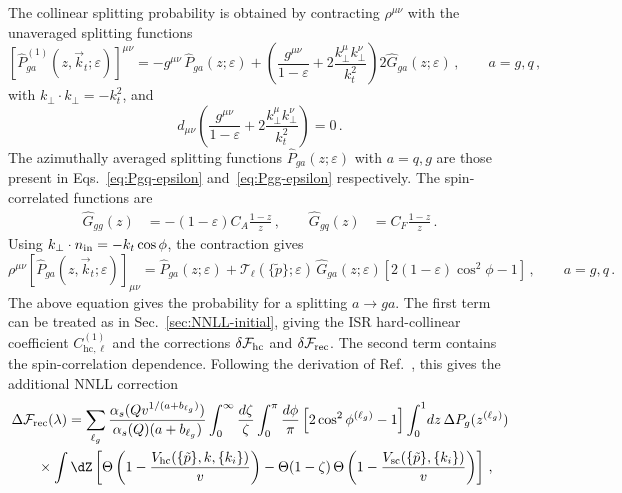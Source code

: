 The collinear splitting probability is obtained by contracting
$\rho^{\mu\nu}$ with the unaveraged splitting functions
\begin{equation}
\left[\hat{P}_{ga}^{(1)}(z,\vec k_t;\varepsilon)\right]^{\mu\nu}
= -g^{\mu\nu}\,\hat{P}_{ga}(z;\varepsilon)
+ \left(\frac{g^{\mu\nu}}{1-\varepsilon} + 2\frac{k_\perp^\mu k_\perp^\nu}{k_t^2}\right)
2\hat G_{ga}(z;\varepsilon)\,, \qquad a = g,q\,,
\end{equation}
with $k_\perp\cdot k_\perp = -k_t^2$, and
\begin{equation}
  \label{eq:Grho}
  d_{\mu\nu}\left(\frac{g^{\mu\nu}}{1-\varepsilon} + 2\frac{k_\perp^\mu k_\perp^\nu}{k_t^2}\right)=0\,.
\end{equation}
The azimuthally averaged splitting functions $\hat{P}_{ga}(z;\varepsilon)$ with $a=q,g$ are those present in Eqs.~\eqref{eq:Pgq-epsilon} and~\eqref{eq:Pgg-epsilon} respectively.
The spin-correlated functions are 
\begin{equation}
\begin{aligned}
\hat G_{gg}(z) &= -(1-\varepsilon)C_A \frac{1-z}{z}\,,\qquad
\hat G_{gq}(z) &= C_F \frac{1-z}{z}\,.
\end{aligned}
\end{equation}
Using $k_\perp \cdot n_{\rm in}=-k_t\cos\phi$, the contraction gives
\begin{equation}
\rho^{\mu\nu}\left[\hat{P}_{ga}(z,\vec k_t;\varepsilon)\right]_{\mu\nu}
= \hat{P}_{ga}(z;\varepsilon)
+  \mathcal{T}_\ell(\{\tilde p\};\varepsilon)\,\hat G_{ga}(z;\varepsilon)\left[2(1-\varepsilon)\cos^2\phi - 1\right]\,,
\qquad a = g,q\,.
\end{equation}
The above equation gives the probability for a splitting $a\to g
a$. The first term can be treated as in Sec.~\ref{sec:NNLL-initial},
giving the ISR hard-collinear coefficient $C_{\mathrm{hc},\ell}^{(1)}$
and the corrections $\delta\mathcal{F}_{\rm hc}$ and
$\delta\mathcal{F}_{\rm rec}$. The second term contains the
spin-correlation dependence. Following the derivation of
Ref.~\cite{Arpino:2019ozn}, this gives the additional NNLL correction
\begin{equation}
\begin{aligned}
\label{eq:DFrec-ISR}
  \Delta&\mathcal{F}_{\mathrm{rec}}(\lambda) =
\sum_{\ell_g}\frac{\alpha_s(Qv^{1/(a+b_{\ell_g})})}{\alpha_s(Q)(a+b_{\ell_g})}\int_0^\infty \frac{d\zeta}{\zeta}
\int_0^\pi \frac{d\phi}{\pi}\left[2\cos^2\phi^{(\ell_g)} - 1\right]
\int_0^1\!dz\,
\Delta P_g(z^{(\ell_g)})
\\
&\quad \times \int \dZ \left[
\Theta\left(1 - \frac{V_{\mathrm{hc}}(\{\tilde{p}\},k,\{k_i\})}{v}\right)
- \Theta(1-\zeta)\,
\Theta\left(1 - \frac{V_{\mathrm{sc}}(\{\tilde{p}\},\{k_i\})}{v}\right)
\right]\,,
\end{aligned}
\end{equation}
